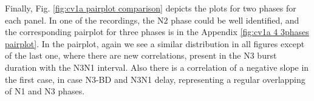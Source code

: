 Finally, Fig. \ref{fig:cv1a pairplot comparison} depicts the plots for two phases for each panel. In one of the recordings, the N2 phase could be well identified, and the corresponding pairplot for three phases is in the Appendix \ref{fig:cv1a 4 3phases pairplot}. In the pairplot, again we see a similar distribution in all figures except of the last one, where there are new correlations, present in the N3 burst duration with the N3N1 interval. Also there is a correlation of a negative slope in the first case, in case N3-BD and N3N1 delay, representing a regular overlapping of N1 and N3 phases. 
%

